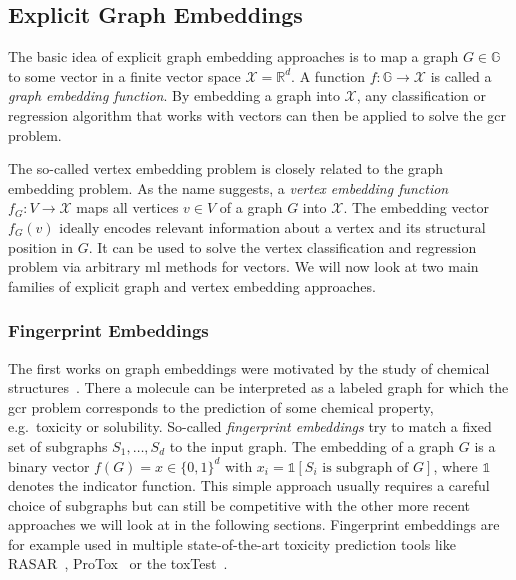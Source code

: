 \subsection{Explicit Graph Embeddings}%
\label{sec:related:gcr:embed}

The basic idea of explicit graph embedding approaches is to map a graph $G \in \mathbb{G}$ to some vector in a finite vector space $\mathcal{X} = \mathbb{R}^d$.
A function $f: \mathbb{G} \to \mathcal{X}$ is called a \textit{graph embedding function}.
By embedding a graph into $\mathcal{X}$, any classification or regression algorithm that works with vectors can then be applied to solve the \ac{gcr} problem.

The so-called vertex embedding problem is closely related to the graph embedding problem.
As the name suggests, a \textit{vertex embedding function} $f_G: V \to \mathcal{X}$ maps all vertices $v \in V$ of a graph $G$ into $\mathcal{X}$.
The embedding vector $f_G(v)$ ideally encodes relevant information about a vertex and its structural position in $G$.
It can be used to solve the vertex classification and regression problem via arbitrary \ac{ml} methods for vectors.
We will now look at two main families of explicit graph and vertex embedding approaches.

\subsubsection{Fingerprint Embeddings}

The first works on graph embeddings were motivated by the study of chemical structures~\cite{Adamson1973}\cite{Willett1986}.
There a molecule can be interpreted as a labeled graph for which the \ac{gcr} problem corresponds to the prediction of some chemical property, e.g.\ toxicity or solubility.
So-called \textit{fingerprint embeddings} try to match a fixed set of subgraphs $S_1, \dots, S_d$ to the input graph.
The embedding of a graph $G$ is a binary vector $f(G) = x \in {\{0, 1\}}^d$ with $x_i = \mathds{1}[\text{$S_i$ is subgraph of $G$}]$, where $\mathds{1}$ denotes the indicator function.
This simple approach usually requires a careful choice of subgraphs but can still be competitive with the other more recent approaches we will look at in the following sections.
Fingerprint embeddings are for example used in multiple state-of-the-art toxicity prediction tools like RASAR~\cite{Luechtefeld2018}\cite{ToxTrack}, ProTox~\cite{Drwal2014}\cite{Banerjee2018}\cite{ProTox} or the \ac{toxTest}~\cite{TEST}.


